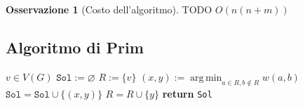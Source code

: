 \documentclass[14pt]{extreport}
\DeclareMathOperator*{\argmin}{arg\,min}
\theoremstyle{definition}
\theoremstyle{definition}
\newtheorem{remark}{Osservazione}[subsection]
\begin{document}
\begin{remark}[Costo dell'algoritmo]
    TODO $O(n(n + m))$
\end{remark}

\subsection{Algoritmo di Prim}

\begin{algorithm}[H]
    \caption{
        Dato un grafo indiretto connesso $G$, pesato attraverso $w$ con pesi strettamente positivi, l'algoritmo ne restituisce un MST.\\
        \textbf{Input}: $G$ grafo indiretto connesso; $w$ una funzione che associa pesi, strettamente positivi, agli archi in $E(G)$.\\
        \textbf{Output}: un MST di $G$.
    }

    \begin{algorithmic}[1]
            \State $v \in V(G)$
            \State $\texttt{Sol} := \varnothing$
            \State $R := \{v\}$
                \State $\displaystyle (x, y) := \argmin_{a \in R, b \notin R} {w(a, b)}$
                \State $\texttt{Sol} = \texttt{Sol} \cup \{ (x, y) \}$
                \State $R = R \cup \{y\}$
            \EndWhile
            \State \textbf{return} \texttt{Sol}
        \EndFunction
    \end{algorithmic}
\end{algorithm}
\end{document}

